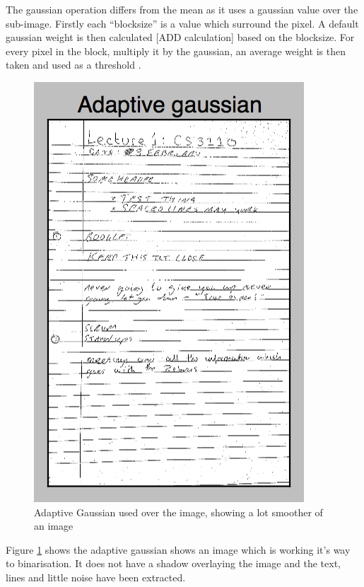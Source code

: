 The gaussian operation differs from the mean as it uses a gaussian value over the sub-image. Firstly each ``blocksize'' is a value which surround the pixel. A default gaussian weight is then calculated [ADD calculation] based on the blocksize. For every pixel in the block, multiply it by the gaussian, an average weight is then taken and used as a threshold \cite{bradski2008learning}\cite{citeulike:1402140}.


\begin{figure}[H]
  \centering
  \includegraphics{images/adaptive_gaussian}
  \caption{Adaptive Gaussian used over the image, showing a lot smoother of an image}
  \label{fig:adaptive_gaussian}
\end{figure}

Figure \ref{fig:adaptive_gaussian} shows the adaptive gaussian shows an image which is working it's way to binarisation. It does not have a shadow overlaying the image and the text, lines and little noise have been extracted.

